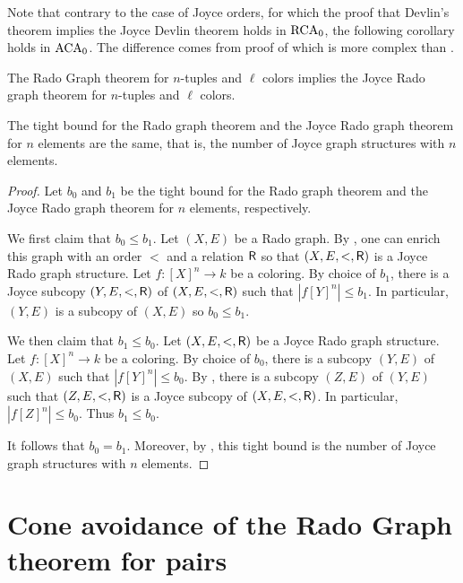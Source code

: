 Note that contrary to the case of Joyce orders, for which the proof that Devlin's theorem implies the Joyce Devlin theorem holds in $\mathrm{RCA}_0$, the following corollary holds in $\ACA_0$. The difference comes from proof of  which is more complex than .

\begin{corollary}[$\ACA_0$]
  The Rado Graph theorem for $n$-tuples and $\ell$ colors implies the Joyce Rado graph theorem for $n$-tuples and $\ell$ colors.
\end{corollary}

\begin{corollary}[$\ACA_0$]
  The tight bound for the Rado graph theorem and the Joyce Rado graph theorem for $n$ elements are the same, that is, the number of Joyce graph structures with $n$ elements.
\end{corollary}
\begin{proof}
Let $b_0$ and $b_1$ be the tight bound for the Rado graph theorem and the Joyce Rado graph theorem for $n$ elements, respectively. 

We first claim that $b_0 \leq b_1$. 
Let $(X, E)$ be a Rado graph. By , one can enrich this graph with an order $<$ and a relation $\mathsf{R}$ so that $(X, E, <, \mathsf{R})$ is a Joyce Rado graph structure. Let $f: [X]^n \to k$ be a coloring. By choice of $b_1$, there is a Joyce subcopy $(Y, E, <, \mathsf{R})$ of $(X, E, <, \mathsf{R})$ such that $|f[Y]^n| \leq b_1$. In particular, $(Y, E)$ is a subcopy of $(X, E)$ so $b_0 \leq b_1$.

We then claim that $b_1 \leq b_0$.
Let $(X, E, <, \mathsf{R})$ be a Joyce Rado graph structure.  Let $f: [X]^n \to k$ be a coloring. By choice of $b_0$, there is a subcopy $(Y, E)$ of $(X, E)$ such that $|f[Y]^n| \leq b_0$. 
By , there is a subcopy $(Z, E)$ of $(Y, E)$ such that $(Z, E, <, \mathsf{R})$ is a Joyce subcopy of $(X, E, <, \mathsf{R})$. In particular, $|f[Z]^n| \leq b_0$. Thus $b_1 \leq b_0$.

It follows that $b_0 = b_1$. Moreover, by , this tight bound is the number of Joyce graph structures with $n$ elements.
\end{proof}
  

\section{Cone avoidance of the Rado Graph theorem for pairs}

